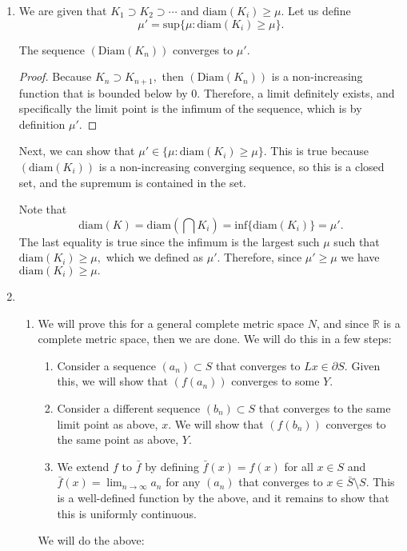 \documentclass{article}
\numberwithin{equation}{section}
\begin{document}
\begin{enumerate}
\begin{enumerate}[label=(\alph*)]
\begin{itemize}
        \end{itemize} 
    \end{enumerate}
    \newpage
    \item We are given that $K_1 \supset K_2 \supset \cdots $ and $\text{diam}(K_i) \ge \mu.$ Let us define 
    \begin{equation}
        \mu' = \text{sup}\{\mu: \text{diam}(K_i) \ge \mu\}.
    \end{equation}
    \begin{lemma}
        The sequence $(\text{Diam}(K_n))$ converges to $\mu'.$
        \begin{proof}
            Because $K_n \supset K_{n+1},$ then $(\text{Diam}(K_n))$ is a non-increasing function that is bounded below by $0.$ Therefore, a limit definitely exists, and specifically the limit point is the infimum of the sequence, which is by definition $\mu'.$
        \end{proof}
    \end{lemma}
    Next, we can show that $\mu' \in \{\mu: \text{diam}(K_i) \ge \mu\}.$ This is true because $(\text{diam}(K_i))$ is a non-increasing converging sequence, so this is a closed set, and the supremum is contained in the set.

    Note that 
    \begin{equation}
        \text{diam}(K) = \text{diam}\left(\bigcap K_i\right) = \text{inf}\{\text{diam}(K_i)\} = \mu'.
    \end{equation}
    The last equality is true since the infimum is the largest such $\mu$ such that $\text{diam}(K_i) \ge \mu,$ which we defined as $\mu'.$ Therefore, since $\mu' \ge \mu$ we have $\text{diam}(K_i) \ge \mu.$
    \newpage
    \item \begin{enumerate}
        \item We will prove this for a general complete metric space $N$, and since $\mathbb{R}$ is a complete metric space, then we are done. We will do this in a few steps:
        
        \begin{enumerate}[label=(\arabic*)]
            \item Consider a sequence $(a_n) \subset S$ that converges to $Lx \in \partial S.$ Given this, we will show that $(f(a_n))$ converges to some $Y.$ 
            \item Consider a different sequence $(b_n) \subset S$ that converges to the same limit point as above, $x.$ We will show that $(f(b_n))$ converges to the same point as above, $Y.$
            \item We extend $f$ to $\bar{f}$ by defining $\bar{f}(x) = f(x)$ for all $x \in S$ and $\bar{f}(x) = \lim_{n\to\infty} a_n$ for any $(a_n)$ that converges to $x \in \bar{S} \setminus S.$ This is a well-defined function by the above, and it remains to show that this is uniformly continuous.
        \end{enumerate}
        We will do the above:


\end{enumerate}
\end{enumerate}
\end{document}
